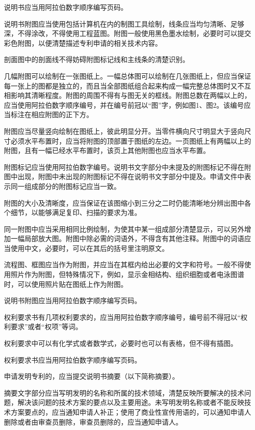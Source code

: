 说明书应当用阿拉伯数字顺序编写页码。

说明书附图应当使用包括计算机在内的制图工具绘制，线条应当均匀清晰、足够深，不得涂改，不得使用工程蓝图。附图一般使用黑色墨水绘制，必要时可以提交彩色附图，以便清楚描述专利申请的相关技术内容。

剖面图中的剖面线不得妨碍附图标记线和主线条的清楚识别。

几幅附图可以绘制在一张图纸上。一幅总体图可以绘制在几张图纸上，但应当保证每一张上的图都是独立的，而且当全部图纸组合起来构成一幅完整总体图时又不互相影响其清晰程度。附图的周围不得有与图无关的框线。附图总数在两幅以上的，应当使用阿拉伯数字顺序编号，并在编号前冠以“图”字，例如图1、图2。该编号应当标注在相应附图的正下方。

附图应当尽量竖向绘制在图纸上，彼此明显分开。当零件横向尺寸明显大于竖向尺寸必须水平布置时，应当将附图的顶部置于图纸的左边。一页图纸上有两幅以上的附图，且有一幅已经水平布置时，该页上其他附图也应当水平布置。

附图标记应当使用阿拉伯数字编号。说明书文字部分中未提及的附图标记不得在附图中出现，附图中未出现的附图标记不得在说明书文字部分中提及。申请文件中表示同一组成部分的附图标记应当一致。

附图的大小及清晰度，应当保证在该图缩小到三分之二时仍能清晰地分辨出图中各个细节，以能够满足复印、扫描的要求为准。

同一附图中应当采用相同比例绘制，为使其中某一组成部分清楚显示，可以另外增加一幅局部放大图。附图中除必需的词语外，不得含有其他注释。附图中的词语应当使用中文，必要时，可以在其后的括号里注明原文。

流程图、框图应当作为附图，并应当在其框内给出必要的文字和符号。一般不得使用照片作为附图，但特殊情况下，例如，显示金相结构、组织细胞或者电泳图谱时，可以使用照片贴在图纸上作为附图。

说明书附图应当用阿拉伯数字顺序编写页码。

权利要求书有几项权利要求的，应当用阿拉伯数字顺序编号，编号前不得冠以“权利要求”或者“权项”等词。

权利要求中可以有化学式或者数学式，必要时也可以有表格，但不得有插图。

权利要求书应当用阿拉伯数字顺序编写页码。

申请发明专利的，应当提交说明书摘要（以下简称摘要）。

摘要文字部分应当写明发明的名称和所属的技术领域，清楚反映所要解决的技术问题，解决该问题的技术方案的要点以及主要用途。未写明发明名称或者不能反映技术方案要点的，应当通知申请人补正；使用了商业性宣传用语的，可以通知申请人删除或者由审查员删除，审查员删除的，应当通知申请人。

